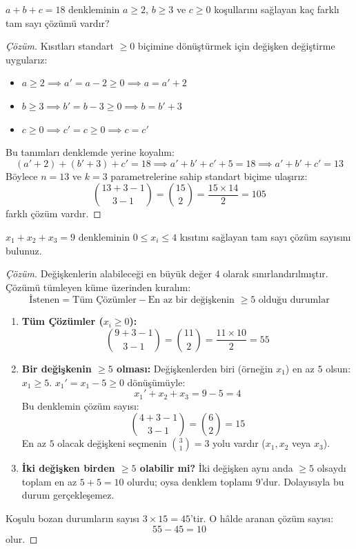 \begin{example}
$a + b + c = 18$ denkleminin $a \ge 2$, $b \ge 3$ ve $c \ge 0$ koşullarını sağlayan kaç farklı tam sayı çözümü vardır?
\end{example}
\begin{proof}[Çözüm]
Kısıtları standart $\ge 0$ biçimine dönüştürmek için değişken değiştirme uygularız:
\begin{itemize}
  \item $a \ge 2 \implies a' = a - 2 \ge 0 \implies a = a' + 2$
  \item $b \ge 3 \implies b' = b - 3 \ge 0 \implies b = b' + 3$
  \item $c \ge 0 \implies c' = c \ge 0 \implies c = c'$
\end{itemize}
Bu tanımları denklemde yerine koyalım:
\[ (a' + 2) + (b' + 3) + c' = 18 \implies a' + b' + c' + 5 = 18 \implies a' + b' + c' = 13 \]
Böylece $n = 13$ ve $k = 3$ parametrelerine sahip standart biçime ulaşırız:
\[ \binom{13 + 3 - 1}{3 - 1} = \binom{15}{2} = \frac{15 \times 14}{2} = 105 \]
farklı çözüm vardır.
\end{proof}

\begin{example}
$x_1 + x_2 + x_3 = 9$ denkleminin $0 \le x_i \le 4$ kısıtını sağlayan tam sayı çözüm sayısını bulunuz.
\end{example}
\begin{proof}[Çözüm]
Değişkenlerin alabileceği en büyük değer $4$ olarak sınırlandırılmıştır. Çözümü tümleyen küme üzerinden kuralım:
\[ \text{İstenen} = \text{Tüm Çözümler} - \text{En az bir değişkenin } \ge 5 \text{ olduğu durumlar} \]

\begin{enumerate}
  \item \textbf{Tüm Çözümler ($x_i \ge 0$):}
  \[ \binom{9 + 3 - 1}{3 - 1} = \binom{11}{2} = \frac{11 \times 10}{2} = 55 \]
  
  \item \textbf{Bir değişkenin $\ge 5$ olması:}
  Değişkenlerden biri (örneğin $x_1$) en az $5$ olsun: $x_1 \ge 5$.
  $x_1' = x_1 - 5 \ge 0$ dönüşümüyle:
  \[ x_1' + x_2 + x_3 = 9 - 5 = 4 \]
  Bu denklemin çözüm sayısı:
  \[ \binom{4 + 3 - 1}{3 - 1} = \binom{6}{2} = 15 \]
  En az $5$ olacak değişkeni seçmenin $\binom{3}{1} = 3$ yolu vardır ($x_1, x_2$ veya $x_3$).
  
  \item \textbf{İki değişken birden $\ge 5$ olabilir mi?}
  İki değişken aynı anda $\ge 5$ olsaydı toplam en az $5 + 5 = 10$ olurdu; oysa denklem toplamı $9$'dur. Dolayısıyla bu durum gerçekleşemez.
\end{enumerate}

Koşulu bozan durumların sayısı $3 \times 15 = 45$'tir.
O hâlde aranan çözüm sayısı:
\[ 55 - 45 = 10 \]
olur.
\end{proof}


